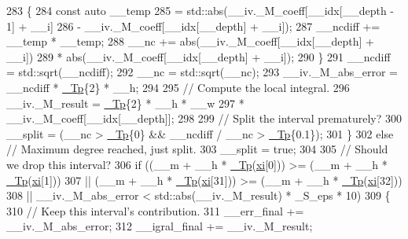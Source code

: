 \begin{DoxyCode}
283                 \{
284                   \textcolor{keyword}{const} \textcolor{keyword}{auto} \_\_temp
285                     = std::abs(\_\_iv.\_M\_coeff[\_\_idx[\_\_depth - 1] + \_\_i]
286                              - \_\_iv.\_M\_coeff[\_\_idx[\_\_depth] + \_\_i]);
287                   \_\_ncdiff += \_\_temp * \_\_temp;
288                   \_\_nc += abs(\_\_iv.\_M\_coeff[\_\_idx[\_\_depth] + \_\_i])
289                         * abs(\_\_iv.\_M\_coeff[\_\_idx[\_\_depth] + \_\_i]);
290                 \}
291               \_\_ncdiff = std::sqrt(\_\_ncdiff);
292               \_\_nc = std::sqrt(\_\_nc);
293               \_\_iv.\_M\_abs\_error = \_\_ncdiff * \hyperlink{namespace____gnu__cxx_a3b19a9c800ca194374ef9172290f7d79}{\_Tp}\{2\} * \_\_h;
294 
295               \textcolor{comment}{// Compute the local integral.}
296               \_\_iv.\_M\_result = \hyperlink{namespace____gnu__cxx_a3b19a9c800ca194374ef9172290f7d79}{\_Tp}\{2\} * \_\_h * \_\_w
297                              * \_\_iv.\_M\_coeff[\_\_idx[\_\_depth]];
298 
299               \textcolor{comment}{// Split the interval prematurely?}
300               \_\_split = (\_\_nc > \hyperlink{namespace____gnu__cxx_a3b19a9c800ca194374ef9172290f7d79}{\_Tp}\{0\} && \_\_ncdiff / \_\_nc > \hyperlink{namespace____gnu__cxx_a3b19a9c800ca194374ef9172290f7d79}{\_Tp}\{0.1\});
301             \}
302           \textcolor{keywordflow}{else} \textcolor{comment}{// Maximum degree reached, just split.}
303             \_\_split = \textcolor{keyword}{true};
304 
305           \textcolor{comment}{// Should we drop this interval?}
306           \textcolor{keywordflow}{if} ((\_\_m + \_\_h * \hyperlink{namespace____gnu__cxx_a3b19a9c800ca194374ef9172290f7d79}{\_Tp}(\hyperlink{namespace____gnu__cxx_a8a912ee89c90a7e5049ce5ffad04274b}{xi}[0])) >= (\_\_m + \_\_h * \hyperlink{namespace____gnu__cxx_a3b19a9c800ca194374ef9172290f7d79}{\_Tp}(\hyperlink{namespace____gnu__cxx_a8a912ee89c90a7e5049ce5ffad04274b}{xi}[1]))
307               || (\_\_m + \_\_h * \hyperlink{namespace____gnu__cxx_a3b19a9c800ca194374ef9172290f7d79}{\_Tp}(\hyperlink{namespace____gnu__cxx_a8a912ee89c90a7e5049ce5ffad04274b}{xi}[31])) >= (\_\_m + \_\_h * \hyperlink{namespace____gnu__cxx_a3b19a9c800ca194374ef9172290f7d79}{\_Tp}(\hyperlink{namespace____gnu__cxx_a8a912ee89c90a7e5049ce5ffad04274b}{xi}[32]))
308               || \_\_iv.\_M\_abs\_error < std::abs(\_\_iv.\_M\_result) * \_S\_eps * 10)
309             \{
310               \textcolor{comment}{// Keep this interval's contribution.}
311               \_\_err\_final += \_\_iv.\_M\_abs\_error;
312               \_\_igral\_final += \_\_iv.\_M\_result;

\end{DoxyCode}
